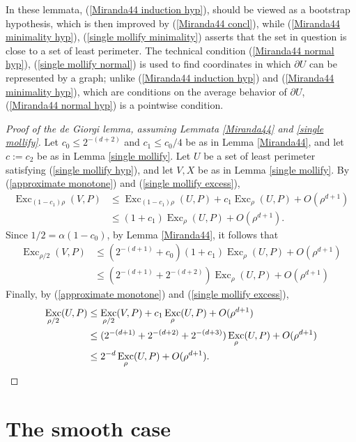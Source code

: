 \documentclass[reqno,11pt]{amsart}
\DeclareMathOperator{\Exc}{Exc}
\theoremstyle{definition}
\numberwithin{equation}{section}
\begin{document}
In these lemmata, (\ref{Miranda44 induction hyp}), should be viewed as a bootstrap hypothesis, which is then improved by (\ref{Miranda44 concl}), while (\ref{Miranda44 minimality hyp}), (\ref{single mollify minimality}) asserts that the set in question is close to a set of least perimeter.
The technical condition (\ref{Miranda44 normal hyp}), (\ref{single mollify normal}) is used to find coordinates in which $\partial U$ can be represented by a graph; unlike (\ref{Miranda44 induction hyp}) and (\ref{Miranda44 minimality hyp}), which are conditions on the average behavior of $\partial U$, (\ref{Miranda44 normal hyp}) is a pointwise condition.

\begin{proof}[Proof of the de Giorgi lemma, assuming Lemmata \ref{Miranda44} and \ref{single mollify}]
Let $c_0 \leq 2^{-(d + 2)}$ and $c_1 \leq c_0/4$ be as in Lemma \ref{Miranda44}, and let $c := c_2$ be as in Lemma \ref{single mollify}.
Let $U$ be a set of least perimeter satisfying (\ref{single mollify hyp}), and let $V, X$ be as in Lemma \ref{single mollify}.
By (\ref{approximate monotone}) and (\ref{single mollify excess}),
\begin{align*}
\Exc_{(1 - c_1) \rho} (V, P) &\leq \Exc_{(1 - c_1) \rho} (U, P) + c_1 \Exc_\rho (U, P) + O(\rho^{d + 1}) \\
&\leq (1 + c_1) \Exc_\rho (U, P) + O(\rho^{d + 1}).
\end{align*}
Since $1/2 = \alpha (1 - c_0)$, by Lemma \ref{Miranda44}, it follows that
\begin{align*}
    \Exc_{\rho/2} (V, P) &\leq (2^{-(d + 1)} + c_0) (1 + c_1) \Exc_\rho (U, P) + O(\rho^{d + 1}) \\
    &\leq (2^{-(d + 1)} + 2^{-(d + 2)}) \Exc_\rho (U, P) + O(\rho^{d + 1})
\end{align*}
Finally, by (\ref{approximate monotone}) and (\ref{single mollify excess}),
\begin{align*}
    \Exc_{\rho/2} (U, P)
    &\leq \Exc_{\rho/2} (V, P) + c_1 \Exc_\rho (U, P) + O(\rho^{d + 1}) \\
    &\leq (2^{-(d + 1)} + 2^{-(d + 2)} + 2^{-(d + 3)}) \Exc_\rho (U, P) + O(\rho^{d + 1})\\
    &\leq 2^{-d} \Exc_\rho (U, P) + O(\rho^{d + 1}). \qedhere
\end{align*}
\end{proof}

\section{The smooth case}\label{smoothcase}
\end{document}
